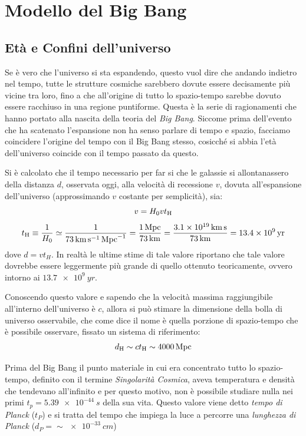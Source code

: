 \section{Modello del Big Bang}\label{sec:big-bang}
\subsection{Età e Confini dell'universo}\label{sec:eta-confini-universo}

Se è vero che l'universo si sta espandendo, questo vuol dire che andando indietro nel tempo, tutte le strutture cosmiche sarebbero dovute essere decisamente più vicine tra loro, fino a che all'origine di tutto lo spazio-tempo sarebbe dovuto essere racchiuso in una regione puntiforme. Questa è la serie di ragionamenti che hanno portato alla nascita della teoria del \emph{Big Bang}. Siccome prima dell'evento che ha scatenato l'espansione non ha senso parlare di tempo e spazio, facciamo coincidere l'origine del tempo con il Big Bang stesso, cosicché si abbia l'età dell'universo coincide con il tempo passato da questo.

Si è calcolato che il tempo necessario per far si che le galassie si allontanassero della distanza $d$, osservata oggi, alla velocità di recessione $v$, dovuta all'espansione dell'universo (approssimando $v$ costante per semplicità), sia:
\[
    v = H_0 v t_\textup{H}
\]
\begin{equation} \label{eq:eta-universo}
    t_\textup{H} \equiv \frac{1}{H_0} \simeq \frac{1}{\SI{73}{km.s^{-1}.Mpc^{-1}}} = \frac{\SI{1}{Mpc}}{\SI{73}{km}} = \frac{\SI{3.1e19}{km.s}}{\SI{73}{km}} = \SI{13.4e9}{yr}
\end{equation}
dove $d = v t_{H}$. In realtà le ultime stime di tale valore riportano che tale valore dovrebbe essere leggermente più grande di quello ottenuto teoricamente, ovvero intorno ai $\SI{13.7e9}{yr}$.

Conoscendo questo valore e sapendo che la velocità massima raggiungibile all'interno dell'universo è $c$, allora si può stimare la dimensione della bolla di universo osservabile, che come dice il nome è quella porzione di spazio-tempo che è possibile osservare, fissato un sistema di riferimento:
\[
    d_\textup{H} \sim c t_\textup{H} \sim \SI{4000}{Mpc}
\]

Prima del Big Bang il punto materiale in cui era concentrato tutto lo spazio-tempo, definito con il termine \emph{Singolarità Cosmica}, aveva temperatura e densità che tendevano all'infinito e per questo motivo, non è possibile studiare nulla nei primi $t_p = \SI{5.39e-44}{s}$ della sua vita. Questo valore viene detto \emph{tempo di Planck} ($t_P$) e si tratta del tempo che impiega la luce a percorre una \emph{lunghezza di Planck} ($d_P = \sim \SI{e-33}{cm}$)

